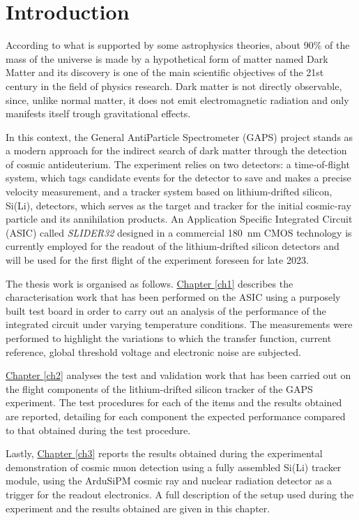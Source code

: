 \chapter*{Introduction}  %

\par
According to what is supported by some astrophysics theories, about 90\% of the mass of the universe is made by a hypothetical form of matter named Dark Matter and its discovery is one of the main scientific objectives of the 21st century in the field of physics research. Dark matter is not directly observable, since, unlike normal matter, it does not emit electromagnetic radiation and only manifests itself trough gravitational effects. 

\par
In this context, the General AntiParticle Spectrometer (GAPS) project stands as a modern approach for the indirect search of dark matter through the detection of cosmic antideuterium. The experiment relies on two detectors: a time-of-flight system, which tags candidate events for the detector to save and makes a precise velocity measurement, and a tracker system based on lithium-drifted silicon, Si(Li), detectors, which serves as the target and tracker for the initial cosmic-ray particle and its annihilation products. An Application Specific Integrated Circuit (ASIC) called \textit{SLIDER32} designed in a commercial \SI{180}{\nano\meter} CMOS technology is currently employed for the readout of the lithium-drifted silicon detectors and will be used for the first flight of the experiment foreseen for late 2023.

\par
The thesis work is organised as follows. \hyperref[ch1]{Chapter \ref{ch1}} describes the characterisation work that has been performed on the ASIC using a purposely built test board in order to carry out an analysis of the performance of the integrated circuit under varying temperature conditions. The measurements were performed to highlight the variations to which the transfer function, current reference, global threshold voltage and electronic noise are subjected.

\par
\hyperref[ch2]{Chapter \ref{ch2}} analyses the test and validation work that has been carried out on the flight components of the lithium-drifted silicon tracker of the GAPS experiment. The test procedures for each of the items and the results obtained are reported, detailing for each component the expected performance compared to that obtained during the test procedure.

\par
Lastly, \hyperref[ch3]{Chapter \ref{ch3}} reports the results obtained during the experimental demonstration of cosmic muon detection using a fully assembled Si(Li) tracker module, using the ArduSiPM cosmic ray and nuclear radiation detector as a trigger for the readout electronics. A full description of the setup used during the experiment and the results obtained are given in this chapter.